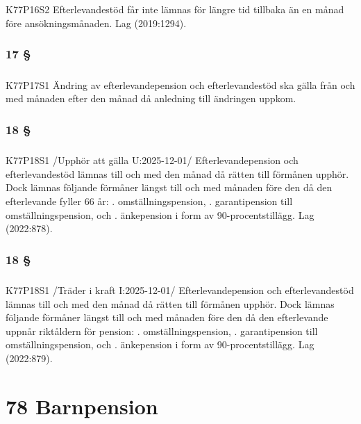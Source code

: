 \documentclass[a4paper,notitlepage,openany,10pt]{book}
\begin{document}
\paragraph*{}
{\tiny K77P16S2}
Efterlevandestöd får inte lämnas för längre tid tillbaka än en månad före ansökningsmånaden.
Lag (2019:1294).
\subsection*{17 §}
\paragraph*{}
{\tiny K77P17S1}
Ändring av efterlevandepension och efterlevandestöd ska gälla från och med månaden efter den månad då anledning till ändringen uppkom.
\subsection*{18 §}
\paragraph*{}
{\tiny K77P18S1}
/Upphör att gälla U:2025-12-01/
Efterlevandepension och efterlevandestöd lämnas till och med den månad då rätten till förmånen upphör. Dock lämnas följande förmåner längst till och med månaden före den då den efterlevande fyller 66 år:
. omställningspension,
. garantipension till omställningspension, och
. änkepension i form av 90-procentstillägg.
Lag (2022:878).
\subsection*{18 §}
\paragraph*{}
{\tiny K77P18S1}
/Träder i kraft I:2025-12-01/
Efterlevandepension och efterlevandestöd lämnas till och med den månad då rätten till förmånen upphör. Dock lämnas följande förmåner längst till och med månaden före den då den efterlevande uppnår riktåldern för pension:
. omställningspension,
. garantipension till omställningspension, och
. änkepension i form av 90-procentstillägg.
Lag (2022:879).
\chapter*{78 Barnpension}
\end{document}

